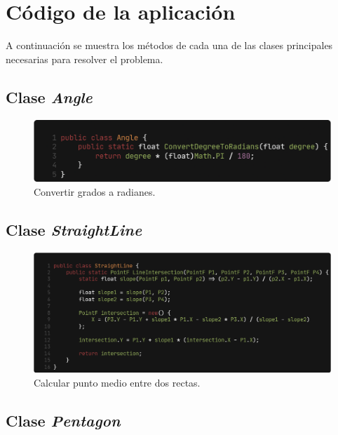 \documentclass[oneside, a4paper]{article}
\begin{document}
    \section{Código de la aplicación}
        A continuación se muestra los métodos de cada una de las clases principales necesarias para resolver el problema.

        \subsection{Clase \textit{Angle}}

            \begin{figure}[H]
                \centering
                \includegraphics[width=\textwidth]{angle_class.png}
                \caption{Convertir grados a radianes.}
                \label{fig:angle_class}
            \end{figure}

        \subsection{Clase \textit{StraightLine}}

            \begin{figure}[H]
                \centering
                \includegraphics[width=\textwidth]{straight_line_class.png}
                \caption{Calcular punto medio entre dos rectas.}
                \label{fig:straight_line_class}
            \end{figure}

        \subsection{Clase \textit{Pentagon}}
\end{document}

